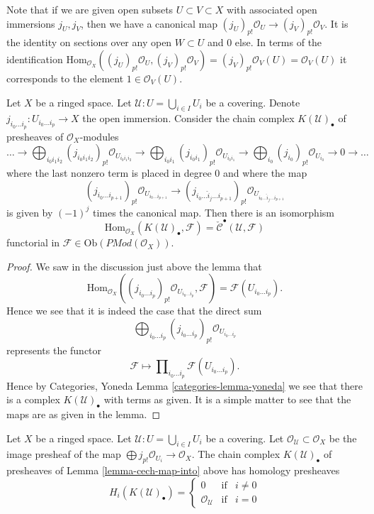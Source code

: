 \medskip\noindent
Note that if we are given open subsets $U \subset V \subset X$
with associated open immersions $j_U, j_V$, then we have a canonical
map $(j_U)_{p!}\mathcal{O}_U \to (j_V)_{p!}\mathcal{O}_V$. It is the
identity on sections over any open $W \subset U$ and $0$ else.
In terms of the identification
$\text{Hom}_{\mathcal{O}_X}((j_U)_{p!}\mathcal{O}_U, (j_V)_{p!}\mathcal{O}_V) =
(j_V)_{p!}\mathcal{O}_V(U) = \mathcal{O}_V(U)$ it corresponds to
the element $1 \in \mathcal{O}_V(U)$.

\begin{lemma}
\label{lemma-cech-map-into}
Let $X$ be a ringed space.
Let $\mathcal{U} : U = \bigcup_{i \in I} U_i$ be a covering.
Denote $j_{i_0\ldots i_p} : U_{i_0 \ldots i_p} \to X$ the open immersion.
Consider the chain complex $K(\mathcal{U})_\bullet$
of presheaves of $\mathcal{O}_X$-modules
$$
\ldots
\to
\bigoplus_{i_0i_1i_2} (j_{i_0i_1i_2})_{p!}\mathcal{O}_{U_{i_0i_1i_2}}
\to
\bigoplus_{i_0i_1} (j_{i_0i_1})_{p!}\mathcal{O}_{U_{i_0i_1}}
\to
\bigoplus_{i_0} (j_{i_0})_{p!}\mathcal{O}_{U_{i_0}}
\to 0 \to \ldots
$$
where the last nonzero term is placed in degree $0$
and where the map
$$
(j_{i_0\ldots i_{p + 1}})_{p!}\mathcal{O}_{U_{i_0\ldots i_{p + 1}}}
\longrightarrow
(j_{i_0\ldots \hat i_j \ldots i_{p + 1}})_{p!}
\mathcal{O}_{U_{i_0\ldots \hat i_j \ldots i_{p + 1}}}
$$
is given by $(-1)^j$ times the canonical map.
Then there is an isomorphism
$$
\text{Hom}_{\mathcal{O}_X}(K(\mathcal{U})_\bullet, \mathcal{F})
=
\check{\mathcal{C}}^\bullet(\mathcal{U}, \mathcal{F})
$$
functorial in $\mathcal{F} \in \text{Ob}(\textit{PMod}(\mathcal{O}_X))$.
\end{lemma}

\begin{proof}
We saw in the discussion just above the lemma that
$$
\text{Hom}_{\mathcal{O}_X}(
(j_{i_0\ldots i_p})_{p!}\mathcal{O}_{U_{i_0\ldots i_p}},
\mathcal{F})
=
\mathcal{F}(U_{i_0\ldots i_p}).
$$
Hence we see that it is indeed the case that the direct sum
$$
\bigoplus\nolimits_{i_0 \ldots i_p}
(j_{i_0 \ldots i_p})_{p!}\mathcal{O}_{U_{i_0 \ldots i_p}}
$$
represents the functor
$$
\mathcal{F}
\longmapsto
\prod\nolimits_{i_0\ldots i_p} \mathcal{F}(U_{i_0\ldots i_p}).
$$
Hence by Categories, Yoneda Lemma \ref{categories-lemma-yoneda}
we see that there is a complex $K(\mathcal{U})_\bullet$ with terms
as given. It is a simple matter to see that the maps are as given
in the lemma.
\end{proof}

\begin{lemma}
\label{lemma-homology-complex}
Let $X$ be a ringed space.
Let $\mathcal{U} : U = \bigcup_{i \in I} U_i$ be a covering.
Let $\mathcal{O}_{\mathcal{U}} \subset \mathcal{O}_X$
be the image presheaf of the map
$\bigoplus j_{p!}\mathcal{O}_{U_i} \to \mathcal{O}_X$.
The chain complex $K(\mathcal{U})_\bullet$ of presheaves
of Lemma \ref{lemma-cech-map-into} above has homology presheaves
$$
H_i(K(\mathcal{U})_\bullet) =
\left\{
\begin{matrix}
0 & \text{if} & i \not = 0 \\
\mathcal{O}_{\mathcal{U}} & \text{if} & i = 0
\end{matrix}
\right.
$$
\end{lemma}

